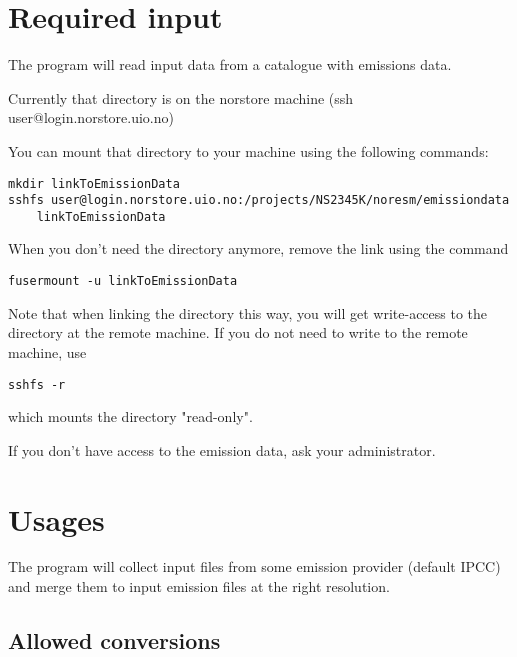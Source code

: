 \documentclass[12pt]{article}
\begin{document}
\section{Required input}

The program will read input data from a catalogue with emissions data.

Currently that directory is on the norstore machine (ssh user@login.norstore.uio.no)

You can mount that directory to your machine using the following commands:
\begin{verbatim}
mkdir linkToEmissionData
sshfs user@login.norstore.uio.no:/projects/NS2345K/noresm/emissiondata 
    linkToEmissionData
\end{verbatim}
When you don't need the directory anymore, remove the link using the command
\begin{verbatim}
fusermount -u linkToEmissionData
\end{verbatim}

Note that when linking the directory this way, you will get write-access to the directory at the remote machine.
If you do not need to write to the remote machine, use \begin{verbatim}sshfs -r \end{verbatim} which mounts the 
directory "read-only".

If you don't have access to the emission data, ask your administrator.

\section{Usages}

The program will collect input files from some emission provider (default IPCC) and merge them to 
input emission files at the right resolution. 

\subsection{Allowed conversions}
\end{document}

